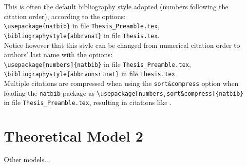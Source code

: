 This is often the default bibliography style adopted (numbers following the citation order), according to the options:\\
{\tt \textbackslash usepackage\{natbib\}} in file {\tt Thesis\_Preamble.tex},\\
{\tt \textbackslash bibliographystyle\{abbrvnat\}} in file {\tt Thesis.tex}.\\

Notice however that this style can be changed from numerical citation order to authors' last name with the options: \\
{\tt \textbackslash usepackage[numbers]\{natbib\}} in file {\tt Thesis\_Preamble.tex},\\
{\tt \textbackslash bibliographystyle\{abbrvunsrtnat\}} in file {\tt Thesis.tex}. \\

Multiple citations are compressed when using the {\tt sort\&compress} option when loading the {\tt natbib} package as {\tt \textbackslash usepackage[numbers,sort\&compress]\{natbib\}} in file {\tt Thesis\_Preamble.tex}, resulting in citations like \citep{marta:ijcfd1,marta:ijcfd2,marta:ijcfd3,marta:ijcfd4}.


\section{Theoretical Model 2}
\label{section:theory2}

Other models...

